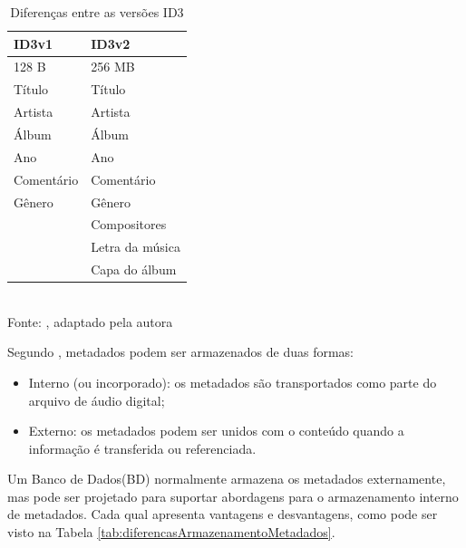 \begin{table}[ht]
    \centering
    \caption{Diferenças entre as versões ID3}
    \begin{tabular}{p{4cm}|p{4cm}}
    \hline
        \textbf{ID3v1} & \textbf{ID3v2} \\
    \hline
        128 B & 256 MB \\
    \hline
        Título & Título \\
    \hline
        Artista & Artista \\
    \hline
        Álbum & Álbum \\
    \hline
        Ano & Ano \\
    \hline
        Comentário & Comentário \\
    \hline
        Gênero & Gênero \\
    \hline
         & Compositores \\
    \hline
         & Letra da música \\
    \hline
         & Capa do álbum \\
    \hline
    \end{tabular}
    \label{tab:diferencasId3}
    \\Fonte: \cite{ferreira2015}, adaptado pela autora
\end{table}

Segundo , metadados podem ser armazenados de duas formas:

\begin{itemize}
    \item Interno (ou incorporado): os metadados são transportados como parte do arquivo de áudio digital;
    \item Externo: os metadados podem ser unidos com o conteúdo quando a informação é transferida ou referenciada.
\end{itemize}

Um Banco de Dados(BD)  normalmente armazena os metadados externamente, mas pode ser projetado para suportar abordagens para o armazenamento interno de metadados. Cada qual apresenta vantagens e desvantagens, como pode ser visto na Tabela \ref{tab:diferencasArmazenamentoMetadados}.

